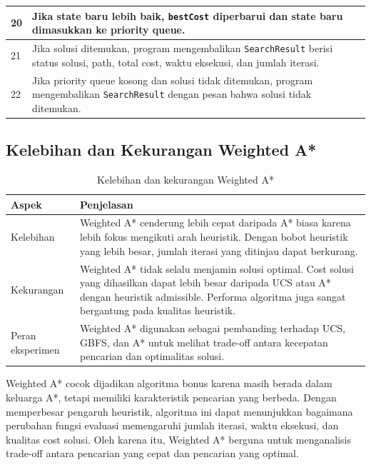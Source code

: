 \begin{longtable}{|p{1.2cm}|p{12.8cm}|}
	\hline
	20 & Jika state baru lebih baik, \texttt{bestCost} diperbarui dan state baru dimasukkan ke priority queue. \\
	\hline
	21 & Jika solusi ditemukan, program mengembalikan \texttt{SearchResult} berisi status solusi, path, total cost, waktu eksekusi, dan jumlah iterasi. \\
	\hline
	22 & Jika priority queue kosong dan solusi tidak ditemukan, program mengembalikan \texttt{SearchResult} dengan pesan bahwa solusi tidak ditemukan. \\
	\hline
\end{longtable}

\subsection{Kelebihan dan Kekurangan Weighted A*}

\begin{table}[H]
	\centering
	\caption{Kelebihan dan kekurangan Weighted A*}
	\begin{tabular}{|p{3.5cm}|p{10.5cm}|}
		\hline
		\rowcolor{purple!15}
		\textbf{Aspek} & \textbf{Penjelasan} \\
		\hline
		Kelebihan & Weighted A* cenderung lebih cepat daripada A* biasa karena lebih fokus mengikuti arah heuristik. Dengan bobot heuristik yang lebih besar, jumlah iterasi yang ditinjau dapat berkurang. \\
		\hline
		Kekurangan & Weighted A* tidak selalu menjamin solusi optimal. Cost solusi yang dihasilkan dapat lebih besar daripada UCS atau A* dengan heuristik admissible. Performa algoritma juga sangat bergantung pada kualitas heuristik. \\
		\hline
		Peran eksperimen & Weighted A* digunakan sebagai pembanding terhadap UCS, GBFS, dan A* untuk melihat trade-off antara kecepatan pencarian dan optimalitas solusi. \\
		\hline
	\end{tabular}
\end{table}

\begin{tcolorbox}[
	colback=purple!5,
	colframe=purple!60!black,
	title=\textbf{Alasan Weighted A* Cocok sebagai Algoritma Bonus},
	arc=2mm,
	boxrule=0.8pt
]
Weighted A* cocok dijadikan algoritma bonus karena masih berada dalam keluarga A*, tetapi memiliki karakteristik pencarian yang berbeda. 
Dengan memperbesar pengaruh heuristik, algoritma ini dapat menunjukkan bagaimana perubahan fungsi evaluasi memengaruhi jumlah iterasi, waktu eksekusi, dan kualitas cost solusi. 
Oleh karena itu, Weighted A* berguna untuk menganalisis trade-off antara pencarian yang cepat dan pencarian yang optimal.
\end{tcolorbox}

